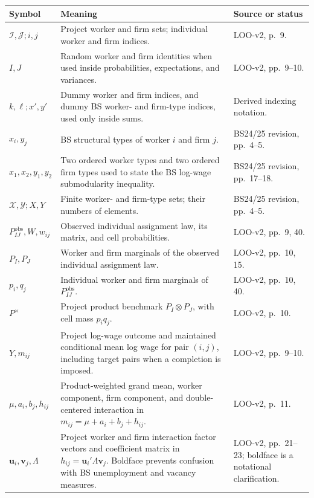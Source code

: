 \documentclass[11pt]{article}
\begin{document}
\begin{longtable}{p{}p{}p{}}
\textbf{Symbol} & \textbf{Meaning} & \textbf{Source or status} \\
\hline
\(\mathcal I,\mathcal J;i,j\) & Project worker and firm sets; individual
worker and firm indices. & LOO-v2, p.\ 9. \\
\(I,J\) & Random worker and firm identities when used inside probabilities,
expectations, and variances. & LOO-v2, pp.\ 9--10. \\
\(k,\ell;x',y'\) & Dummy worker and firm indices, and dummy BS worker- and
firm-type indices, used only inside sums. & Derived indexing notation. \\
\(x_i,y_j\) & BS structural types of worker \(i\) and firm \(j\). &
BS24/25 revision, pp.\ 4--5. \\
\(x_1,x_2,y_1,y_2\) & Two ordered worker types and two ordered firm types used
to state the BS log-wage submodularity inequality. & BS24/25 revision,
pp.\ 17--18. \\
\(\mathcal X,\mathcal Y;X,Y\) & Finite worker- and firm-type sets; their
numbers of elements. & BS24/25 revision, pp.\ 4--5. \\
\(P^{\mathrm{obs}}_{IJ},W,w_{ij}\) & Observed individual assignment law, its
matrix, and cell probabilities. & LOO-v2, pp.\ 9, 40. \\
\(P_I,P_J\) & Worker and firm marginals of the observed individual assignment
law. & LOO-v2, pp.\ 10, 15. \\
\(p_i,q_j\) & Individual worker and firm marginals of
\(P^{\mathrm{obs}}_{IJ}\). & LOO-v2, pp.\ 10, 40. \\
\(P^\times\) & Project product benchmark
\(P_I\otimes P_J\), with cell mass \(p_iq_j\). & LOO-v2, p.\ 10. \\
\(Y,m_{ij}\) & Project log-wage outcome and maintained conditional mean log
wage for pair
\((i,j)\), including target pairs when a completion is imposed. & LOO-v2,
pp.\ 9--10. \\
\(\mu,a_i,b_j,h_{ij}\) & Product-weighted grand mean, worker component, firm
component, and double-centered interaction in
\(m_{ij}=\mu+a_i+b_j+h_{ij}\). & LOO-v2, p.\ 11. \\
\(\mathbf u_i,\mathbf v_j,\Lambda\) & Project worker and firm interaction
factor vectors and coefficient matrix in
\(h_{ij}=\mathbf u_i'\Lambda\mathbf v_j\).  Boldface prevents confusion with
BS unemployment and vacancy measures. & LOO-v2, pp.\ 21--23; boldface is a
notational clarification. \\

\end{longtable}
\end{document}

